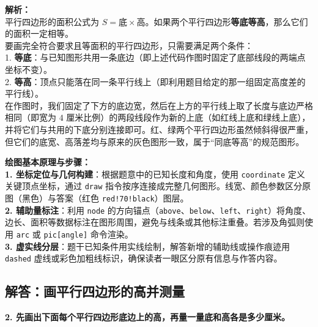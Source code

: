 \vspace{0.6cm}
{\small\color{gray}
\textbf{解析：}\\
平行四边形的面积公式为 $S = \text{底} \times \text{高}$。如果两个平行四边形\textbf{等底等高}，那么它们的面积一定相等。\\
要画完全符合要求且等面积的平行四边形，只需要满足两个条件：\\
1. \textbf{等底}：与已知图形共用一条底边（即上述代码作图时固定了底部线段的两端点坐标不变）。\\
2. \textbf{等高}：顶点只能落在同一条平行线上（即利用题目给定的那一组固定高度差的平行线）。\\
在作图时，我们固定了下方的底边宽，然后在上方的平行线上取了长度与底边严格相同（即宽为 $4$ 厘米比例）的两段线段作为新的上底（如红线上底和绿线上底），并将它们与共用的下底分别连接即可。红、绿两个平行四边形虽然倾斜得很严重，但它们的底宽、高落差均与原来的灰色图形一致，属于“同底等高”的规范图形。
}


\vspace{0.6cm}

{\small\color{blue!70!black}
\textbf{绘图基本原理与步骤：}\\
\textbf{1. 坐标定位与几何构建}：根据题意中的已知长度和角度，使用 \texttt{coordinate} 定义关键顶点坐标，通过 \texttt{draw} 指令按序连接成完整几何图形。线宽、颜色参数区分原图（黑色）与答案（红色 \texttt{red!70!black}）图层。\\
\textbf{2. 辅助量标注}：利用 \texttt{node} 的方向锚点（\texttt{above}、\texttt{below}、\texttt{left}、\texttt{right}）将角度、边长、面积等数据标注在图形周围，避免与线条或其他标注重叠。若涉及角弧则使用 \texttt{arc} 或 \texttt{pic[angle]} 命令渲染。\\
\textbf{3. 虚实线分层}：题干已知条件用实线绘制，解答新增的辅助线或操作痕迹用 \texttt{dashed} 虚线或彩色加粗线标识，确保读者一眼区分原有信息与作答内容。
}

\newpage

\newpage

\subsection{解答：画平行四边形的高并测量}

\vspace{0.4cm}

\noindent\textbf{2. 先画出下面每个平行四边形底边上的高，再量一量底和高各是多少厘米。}

